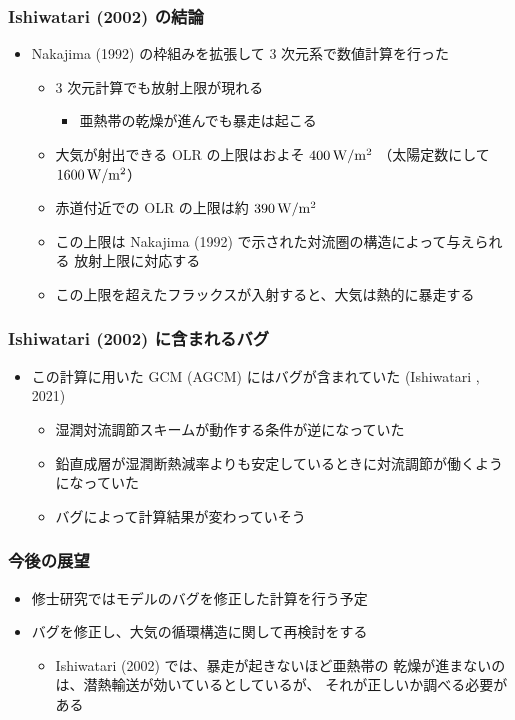 \documentclass[aspectratio=149,9pt,fleqn]{beamer}
\begin{document}

\begin{frame}
	\frametitle{Ishiwatari \etal (2002) の結論}
	\begin{itemize}
		\item Nakajima \etal (1992) の枠組みを拡張して 3 次元系で数値計算を行った
		\begin{itemize}
			\item 3 次元計算でも放射上限が現れる
				\begin{itemize}
					\item 亜熱帯の乾燥が進んでも暴走は起こる
				\end{itemize}
			\item 大気が射出できる OLR の上限はおよそ \(400\hmu{W/m^2}\)
				（太陽定数にして \(1600\hmu{W/m^2}\)）
			\item 赤道付近での OLR の上限は約 \(390\hmu{W/m^2}\)
			\item この上限は Nakajima \etal (1992) で示された対流圏の構造によって与えられる
				放射上限に対応する
			\item この上限を超えたフラックスが入射すると、大気は熱的に暴走する
		\end{itemize}
	\end{itemize}
\end{frame}

\begin{frame}
	\frametitle{Ishiwatari \etal (2002) に含まれるバグ}
	\begin{itemize}
		\item この計算に用いた GCM (AGCM) にはバグが含まれていた (Ishiwatari \etal*, 2021)
			\begin{itemize}
				\item 湿潤対流調節スキームが動作する条件が逆になっていた
				\item 鉛直成層が湿潤断熱減率よりも安定しているときに対流調節が働くようになっていた
				\item バグによって計算結果が変わっていそう
			\end{itemize}
	\end{itemize}
\end{frame}

\begin{frame}
	\frametitle{今後の展望}
	\begin{itemize}
		\item 修士研究ではモデルのバグを修正した計算を行う予定
		\item バグを修正し、大気の循環構造に関して再検討をする
			\begin{itemize}
				\item Ishiwatari \etal (2002) では、暴走が起きないほど亜熱帯の
					乾燥が進まないのは、潜熱輸送が効いているとしているが、
					それが正しいか調べる必要がある
			\end{itemize}
	\end{itemize}
\end{frame}
\end{document}
